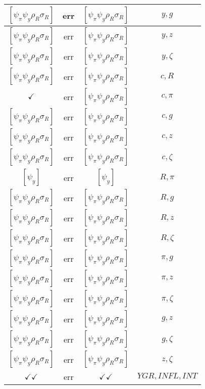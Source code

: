 \documentclass[a4paper,10pt]{article}
\begin{document}
\begin{longtable}{|c|c|c|c|}
\hline
$[\psi_\pi \psi_y \rho_R \sigma_R ]$ & err & $[\psi_\pi \psi_y \rho_R \sigma_R ]$ & ${y},{g}$ \\
\hline
$[\psi_\pi \psi_y \rho_R \sigma_R ]$ & err & $[\psi_\pi \psi_y \rho_R \sigma_R ]$ & ${y},{z}$ \\
\hline
$[\psi_\pi \psi_y \rho_R \sigma_R ]$ & err & $[\psi_\pi \psi_y \rho_R \sigma_R ]$ & ${y},{\zeta}$ \\
\hline
$[\psi_\pi \psi_y \rho_R \sigma_R ]$ & err & $[\psi_\pi \psi_y \rho_R \sigma_R ]$ & ${c},{R}$ \\
\hline
$\checkmark$ & err & $[\psi_\pi \psi_y \rho_R \sigma_R ]$ & ${c},{\pi}$ \\
\hline
$[\psi_\pi \psi_y \rho_R \sigma_R ]$ & err & $[\psi_\pi \psi_y \rho_R \sigma_R ]$ & ${c},{g}$ \\
\hline
$[\psi_\pi \psi_y \rho_R \sigma_R ]$ & err & $[\psi_\pi \psi_y \rho_R \sigma_R ]$ & ${c},{z}$ \\
\hline
$[\psi_\pi \psi_y \rho_R \sigma_R ]$ & err & $[\psi_\pi \psi_y \rho_R \sigma_R ]$ & ${c},{\zeta}$ \\
\hline
$[\psi_y ]$ & err & $[\psi_y ]$ & ${R},{\pi}$ \\
\hline
$[\psi_\pi \psi_y \rho_R \sigma_R ]$ & err & $[\psi_\pi \psi_y \rho_R \sigma_R ]$ & ${R},{g}$ \\
\hline
$[\psi_\pi \psi_y \rho_R \sigma_R ]$ & err & $[\psi_\pi \psi_y \rho_R \sigma_R ]$ & ${R},{z}$ \\
\hline
$[\psi_\pi \psi_y \rho_R \sigma_R ]$ & err & $[\psi_\pi \psi_y \rho_R \sigma_R ]$ & ${R},{\zeta}$ \\
\hline
$[\psi_\pi \psi_y \rho_R \sigma_R ]$ & err & $[\psi_\pi \psi_y \rho_R \sigma_R ]$ & ${\pi},{g}$ \\
\hline
$[\psi_\pi \psi_y \rho_R \sigma_R ]$ & err & $[\psi_\pi \psi_y \rho_R \sigma_R ]$ & ${\pi},{z}$ \\
\hline
$[\psi_\pi \psi_y \rho_R \sigma_R ]$ & err & $[\psi_\pi \psi_y \rho_R \sigma_R ]$ & ${\pi},{\zeta}$ \\
\hline
$[\psi_\pi \psi_y \rho_R \sigma_R ]$ & err & $[\psi_\pi \psi_y \rho_R \sigma_R ]$ & ${g},{z}$ \\
\hline
$[\psi_\pi \psi_y \rho_R \sigma_R ]$ & err & $[\psi_\pi \psi_y \rho_R \sigma_R ]$ & ${g},{\zeta}$ \\
\hline
$[\psi_\pi \psi_y \rho_R \sigma_R ]$ & err & $[\psi_\pi \psi_y \rho_R \sigma_R ]$ & ${z},{\zeta}$ \\
\hline
$\checkmark\checkmark$ & err & $\checkmark\checkmark$ & ${YGR},{INFL},{INT}$ \\

\end{longtable}
\end{document}
